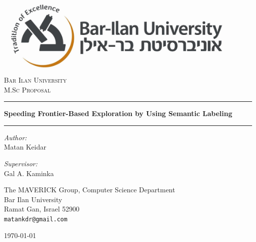 \documentclass[a4paper,10pt]{article}
\begin{document}
\begin{titlepage}
\begin{center}


\includegraphics[width=0.9\textwidth]{images/logo.jpg}\\[1cm]
\textsc{\LARGE Bar Ilan University}\\[1.5cm]
\textsc{\Large M.Sc Proposal}\\[0.5cm]

\hrule
{ \vspace{2 mm} }
{ \huge \bfseries Speeding Frontier-Based Exploration by
Using Semantic Labeling}
{ \vspace{3 mm} }
\hrule
{ \vspace{8 mm} }

\begin{minipage}{0.4\textwidth}
\begin{flushleft} \large
\emph{Author:}\\
Matan Keidar 

\end{flushleft}
\end{minipage}
\begin{minipage}{0.4\textwidth}
\begin{flushleft} \large
\emph{Supervisor:} \\
Gal A. Kaminka
\end{flushleft}
\end{minipage}


\vfill


\large{The MAVERICK Group, Computer Science Department\\
Bar Ilan University\\
Ramat Gan, Israel 52900\\
\tt\small matankdr@gmail.com}

\vfill

\today

\end{center}
\end{titlepage}
\end{document}
